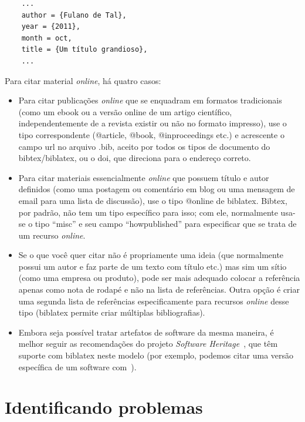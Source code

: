 \begin{verbatim}
    ...
    author = {Fulano de Tal},
    year = {2011},
    month = oct,
    title = {Um título grandioso},
    ...
\end{verbatim}

Para citar material \emph{online}, há quatro casos:

\begin{itemize}
  \item Para citar publicações \emph{online} que se enquadram em
  formatos tradicionais (como um ebook ou a versão online de um artigo
  científico, independentemente de a revista existir ou não no formato
  impresso), use o tipo correspondente (\textsf{@article}, \textsf{@book},
  \textsf{@inproceedings} etc.) e acrescente o campo \textsf{url} no
  arquivo .bib, aceito por todos os tipos de documento do bibtex/biblatex,
  ou o \textsf{doi}, que direciona para o endereço correto.

  \item Para citar materiais essencialmente \emph{online} que possuem
  título e autor definidos (como uma postagem ou comentário em blog
  ou uma mensagem de email para uma lista de discussão), use o tipo
  \textsf{@online} de biblatex. Bibtex, por padrão,
  não tem um tipo específico para isso; com ele, normalmente usa-se
  o tipo ``misc'' e seu campo ``howpublished'' para especificar que
  se trata de um recurso \emph{online}.

  \item Se o que você quer citar não é propriamente uma ideia (que
  normalmente possui um autor e faz parte de um texto com título etc.)
  mas sim um sítio (como uma empresa ou produto), pode ser mais adequado
  colocar a referência apenas como nota de rodapé e não na lista de
  referências. Outra opção é criar uma segunda lista de referências
  especificamente para recursos \emph{online} desse tipo
  (biblatex permite criar múltiplas bibliografias).

  \item Embora seja possível tratar artefatos de software da mesma
  maneira, é melhor seguir as recomendações do projeto \emph{Software
  Heritage}~\citep{soft-with-style}, que têm suporte com biblatex
  neste modelo (por exemplo, podemos citar uma versão específica de
  um software com~\cite{mlh-archiver}).
\end{itemize}

\section{Identificando problemas}

